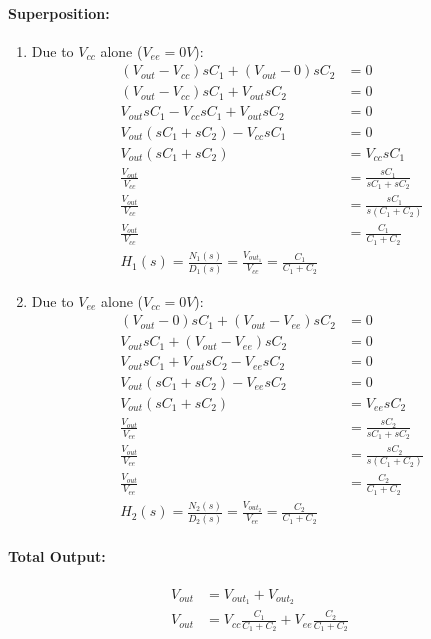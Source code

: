 \paragraph{Superposition:}
\begin{enumerate}
  \item Due to \(V_{cc}\) alone (\(V_{ee} = 0V\)):
    \begin{align*}
      (V_{out} - V_{cc}){sC_1} + (V_{out} - 0){sC_2} &= 0 \\
      (V_{out} - V_{cc}){sC_1} + V_{out}{sC_2} &= 0 \\
      V_{out}sC_1 - V_{cc}sC_1 + V_{out}sC_2 &= 0 \\
      V_{out}(sC_1 + sC_2) - V_{cc}sC_1 &= 0 \\
      V_{out}(sC_1 + sC_2) &= V_{cc}sC_1 \\
      \frac{V_{out}}{V_{cc}} &= \frac{sC_1}{sC_1 + sC_2} \\
      \frac{V_{out}}{V_{cc}} &= \frac{sC_1}{s(C_1 + C_2)} \\
      \frac{V_{out}}{V_{cc}} &= \frac{C_1}{C_1 + C_2} \\
      H_1(s) = \frac{N_1(s)}{D_1(s)} = \frac{V_{out_1}}{V_{cc}} = \frac{C_1}{C_1 + C_2}
    \end{align*}
  \item Due to \(V_{ee}\) alone (\(V_{cc} = 0V\)):
    \begin{align*}
      (V_{out} - 0){sC_1} + (V_{out} - V_{ee}){sC_2} &= 0 \\
      V_{out}sC_1 + (V_{out} - V_{ee}){sC_2} &= 0 \\
      V_{out}sC_1 + V_{out}sC_2 - V_{ee}sC_2 &= 0 \\
      V_{out}(sC_1 + sC_2) - V_{ee}sC_2 &= 0 \\
      V_{out}(sC_1 + sC_2) &= V_{ee}sC_2 \\
      \frac{V_{out}}{V_{ee}} &= \frac{sC_2}{sC_1 + sC_2} \\
      \frac{V_{out}}{V_{ee}} &= \frac{sC_2}{s(C_1 + C_2)} \\
      \frac{V_{out}}{V_{ee}} &= \frac{C_2}{C_1 + C_2} \\
      H_2(s) = \frac{N_2(s)}{D_2(s)} = \frac{V_{out_2}}{V_{ee}} = \frac{C_2}{C_1 + C_2}
    \end{align*}
\end{enumerate}

\paragraph{Total Output:}
\begin{align*}
  V_{out} &= V_{out_1} + V_{out_2} \\
  V_{out} &= V_{cc} \frac{C_1}{C_1 + C_2} + V_{ee} \frac{C_2}{C_1 + C_2}
\end{align*}

